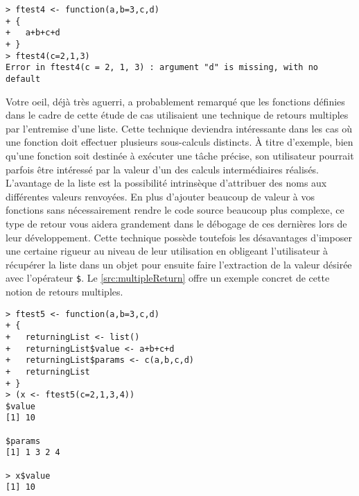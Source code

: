 \begin{lstlisting}[caption = L'assignation et les valeurs par défaut,label=src:assignPositionalDefault]
> ftest4 <- function(a,b=3,c,d)
+ {
+   a+b+c+d
+ }
> ftest4(c=2,1,3)
Error in ftest4(c = 2, 1, 3) : argument "d" is missing, with no default
\end{lstlisting}

\vspace{\baselineskip}
Votre oeil, déjà très aguerri, a probablement remarqué que les fonctions définies dans le cadre de cette étude de cas utilisaient une technique de retours multiples par l'entremise d'une liste. Cette technique deviendra intéressante dans les cas où une fonction doit effectuer plusieurs sous-calculs distincts. À titre d'exemple, bien qu'une fonction soit destinée à exécuter une tâche précise, son utilisateur pourrait parfois être intéressé par la valeur d'un des calculs intermédiaires réalisés. L'avantage de la liste est la possibilité intrinsèque d'attribuer des noms aux différentes valeurs renvoyées. En plus d'ajouter beaucoup de valeur à vos fonctions sans nécessairement rendre le code source beaucoup plus complexe, ce type de retour vous aidera grandement dans le débogage de ces dernières lors de leur développement. Cette technique possède toutefois les désavantages d'imposer une certaine rigueur au niveau de leur utilisation en obligeant l'utilisateur à récupérer la liste dans un objet pour ensuite faire l'extraction de la valeur désirée avec l'opérateur \texttt{\$}. Le \autoref{src:multipleReturn} offre un exemple concret de cette notion de retours multiples.

\begin{lstlisting}[caption = Retours multiples par l'entremise d'une liste,label=src:multipleReturn]
> ftest5 <- function(a,b=3,c,d)
+ {
+   returningList <- list()
+   returningList$value <- a+b+c+d
+   returningList$params <- c(a,b,c,d)
+   returningList
+ }
> (x <- ftest5(c=2,1,3,4))
$value
[1] 10

$params
[1] 1 3 2 4

> x$value
[1] 10
\end{lstlisting}

